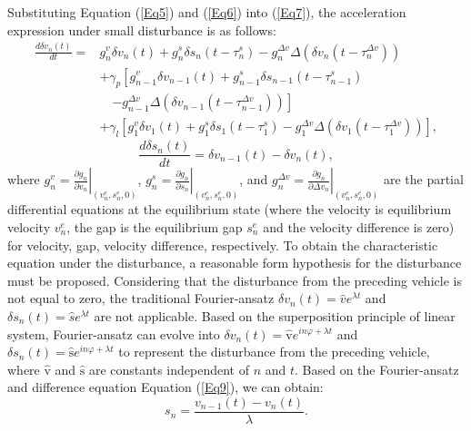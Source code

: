 \documentclass[journal]{IEEEtran}
\begin{document}
Substituting Equation (\ref{Eq5}) and (\ref{Eq6}) into (\ref{Eq7}), the acceleration expression under small disturbance is as follows:
\begin{equation}
  \begin{aligned}
    \frac{d \delta v_{n}(t)}{d t}= & g_{n}^{v} \delta v_{n}(t)+g_{n}^{s} \delta s_{n}\left(t-\tau_{n}^{s}\right)-g_{n}^{\Delta v} \Delta\left(\delta v_{n}\left(t-\tau_{n}^{\Delta v}\right)\right)                          \\
                                   & +\gamma_{p}\left[g_{n-1}^{v} \delta v_{n-1}(t)+g_{n-1}^{s} \delta s_{n-1}\left(t-\tau_{n-1}^{s}\right)\right.                                                                           \\
                                   & \quad\left.-g_{n-1}^{\Delta v} \Delta\left(\delta v_{n-1}\left(t-\tau_{n-1}^{\Delta v}\right)\right)\right]                                                                             \\
                                   & +\gamma_{l}\left[g_{1}^{v} \delta v_{1}(t)+g_{1}^{s} \delta s_{1}\left(t-\tau_{1}^{s}\right)-g_{1}^{\Delta v} \Delta\left(\delta v_{1}\left(t-\tau_{1}^{\Delta v}\right)\right)\right],
  \end{aligned}
  \label{Eq8}
\end{equation}
\begin{equation}
  \frac{d \delta s_{n}(t)}{d t}=\delta v_{n-1}(t)-\delta v_{n}(t),
  \label{Eq9}
\end{equation}
where $g_{n}^{v}=\left.\frac{\partial g_{n}}{\partial v_{n}}\right|_{\left(v_{n}^{e}, s_{n}^{e}, 0\right)}$, $g_{n}^{s}=\left.\frac{\partial g_{n}}{\partial s_{n}}\right|_{\left(v_{n}^{e}, s_{n}^{e}, 0\right)}$, and $g_{n}^{\Delta v}=\left.\frac{\partial g_{n}}{\partial \Delta v_{n}}\right|_{\left(v_{n}^{e}, s_{n}^{e}, 0\right)}$ are the partial differential equations at the equilibrium state (where the velocity is equilibrium velocity $v_{n}^{e}$, the gap is the equilibrium gap $s_{n}^{e}$ and the velocity difference is zero) for velocity, gap, velocity difference, respectively. To obtain the characteristic equation under the disturbance, a reasonable form hypothesis for the disturbance must be proposed. Considering that the disturbance from the preceding vehicle is not equal to zero, the traditional Fourier-ansatz $\delta v_{n}(t)=\hat{v} e^{\lambda t}$ and $\delta s_{n}(t)=\hat{s} e^{\lambda t}$ are not applicable. Based on the superposition principle of linear system, Fourier-ansatz can evolve into $\delta v_{n}(t)=\hat{\mathrm{v}} e^{i n \varphi+\lambda t}$ and $\delta s_{n}(t)=\hat{\mathrm{s}} e^{i n \varphi+\lambda t}$ to represent the disturbance from the preceding vehicle, where $\hat{\mathrm{v}}$ and $\hat{\mathrm{s}}$ are constants independent of $n$ and $t$. Based on the Fourier-ansatz and difference equation Equation (\ref{Eq9}), we can obtain:
\begin{equation}
  s_{n}=\frac{v_{n-1}(t)-v_{n}(t)}{\lambda}.
  \label{Eq10}
\end{equation}
\end{document}
